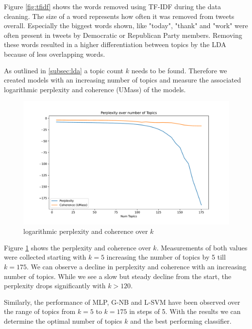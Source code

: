 \documentclass[sigconf, nonacm]{acmart}
\begin{document}
Figure \ref{fig:tfidf} shows the words removed using TF-IDF during the data cleaning. The size of a word represents how often it was removed from tweets overall. Especially the biggest words shown, like "today", "thank" and "work" were often present in tweets by Democratic or Republican Party members. Removing these words resulted in a higher differentiation between topics by the LDA because of less overlapping words.

As outlined in \ref{subsec:lda} a topic count $k$ needs to be found. Therefore we created models with an increasing number of topics and measure the associated logarithmic perplexity and coherence (UMass) of the models.

\begin{figure}[h]
	\centering
	\includegraphics[width=\linewidth, trim={2cm 0cm 2cm 1.7cm}, clip]{figures/40k/perplexity_coherence_over_topics.pdf}
	\caption{logarithmic perplexity and coherence over $k$}
	\label{fig:topiccount}
\end{figure}

Figure \ref{fig:topiccount} shows the perplexity and coherence over $k$. Measurements of both values were collected starting with $k=5$ increasing the number of topics by 5 till $k=175$. We can observe a decline in perplexity and coherence with an increasing number of topics. While we see a slow but steady decline from the start, the perplexity drops significantly with $k>120$.

\newpage

Similarly, the performance of MLP, G-NB and L-SVM have been observed over the range of topics from $k=5$ to $k=175$ in steps of 5. 
With the results we can determine the optimal number of topics $k$ and the best performing classifier.
\end{document}
